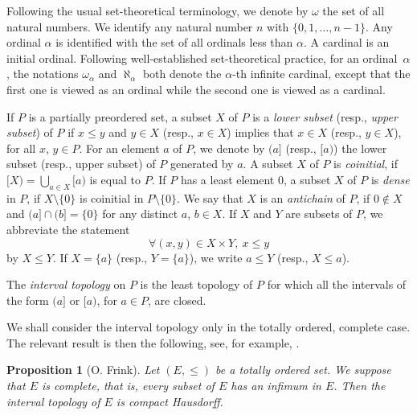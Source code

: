 \documentclass[psamsfonts,reqno]{memo-l}
\theoremstyle{plain}
\newtheorem{proposition}[lemma]{Proposition}
\theoremstyle{definition}
\theoremstyle{remark}
\numberwithin{equation}{section}
\newcommand{\set}[1]{\{#1\}}
\begin{document}
Following the usual set-the\-o\-ret\-i\-cal terminology, we denote by
$\omega$ the set of all natural numbers. We identify any natural number
$n$ with $\set{0,1,\dots,n-1}$.
Any ordinal $\alpha$ is identified with the set of all ordinals less than
$\alpha$. A cardinal is an initial ordinal. Following well-established
set-the\-o\-ret\-i\-cal practice, for an ordinal~$\alpha$, the notations
$\omega_\alpha$ and $\aleph_\alpha$ both denote the $\alpha$-th infinite
cardinal, except that the first one is viewed as an ordinal while the second
one is viewed as a cardinal.

If $P$ is a partially preordered set, a subset $X$ of $P$ is a \emph{lower
subset} (resp., \emph{upper subset}) of $P$ if $x\leq y$ and $y\in X$ (resp.,
$x\in X$) implies that $x\in X$ (resp., $y\in X$), for all $x$, $y\in P$.
For an element $a$ of $P$, we denote by $(a]$ (resp., $[a)$) the lower subset
(resp., upper subset) of $P$ generated by $a$. A subset $X$ of $P$ is
\emph{coinitial},
if $[X)=\bigcup_{a\in X}[a)$ is equal to $P$. If $P$ has a
least element $0$, a subset $X$ of $P$ is \emph{dense} in
$P$, if $X\setminus\set{0}$ is coinitial in $P\setminus\set{0}$. We say that
$X$ is an \emph{antichain} of $P$, if $0\notin X$ and
$(a]\cap(b]=\set{0}$ for any distinct $a$, $b\in X$.
If $X$ and $Y$ are subsets of $P$, we abbreviate the statement
   \[
   \forall (x,y)\in X\times Y,\ x\leq y
   \]
by $X\leq Y$. If $X=\set{a}$ (resp., $Y=\set{a}$), we write $a\leq Y$
(resp., $X\leq a$).

The \emph{interval topology} on $P$ is the least
topology of $P$ for which all the intervals of the form $(a]$ or $[a)$, for
$a\in P$, are closed.

We shall consider the interval topology only in the totally ordered, complete
case. The relevant result is then the following, see, for example,
\cite[\S X.12]{Birk}.

\begin{proposition}[O. Frink]\label{P:Frink}
Let $(E,\leq)$ be a totally ordered set. We suppose that $E$ is
\emph{complete}, that is, every subset of $E$ has an infimum in $E$.
Then the interval topology of $E$ is compact Hausdorff.
\end{proposition}
\end{document}
